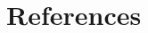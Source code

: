 \thispagestyle{empty}
\chapter{References}
\begin{thebibliography}{1000}
  

\thispagestyle{empty}
\cleardoublepage
\end{thebibliography}

\thispagestyle{empty}
\insertindex
